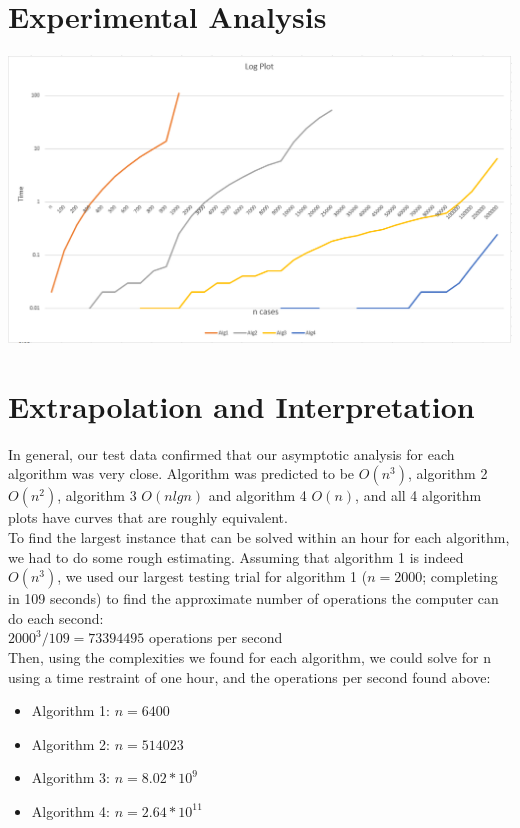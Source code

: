 \documentclass[11pt,letterpaper]{article}
\begin{document}
\section{Experimental Analysis}
\centerline{\includegraphics[width=7in]{LogPlot.png}}

\section{Extrapolation and Interpretation}
In general, our test data confirmed that our asymptotic analysis for each algorithm was very close. Algorithm was predicted to be $O(n^3)$, algorithm 2 $O(n^2)$, algorithm 3 $O(nlgn)$ and algorithm 4 $O(n)$, and all 4 algorithm plots have curves that are roughly equivalent.\vspace{8pt}
\\
To find the largest instance that can be solved within an hour for each algorithm, we had to do some rough estimating. Assuming that algorithm 1 is indeed $O(n^3)$, we used our largest testing trial for algorithm 1 ($n=2000$; completing in 109 seconds) to find the approximate number of operations the computer can do each second:\vspace{8pt}
\\
\hspace{10mm}$2000^3 / 109 = 73394495$ operations per second\vspace{8pt}
\\
Then, using the complexities we found for each algorithm, we could solve for n using a time restraint of one hour,  and the operations per second found above:\\
\begin{itemize}
\item Algorithm 1: $n=6400$
\item Algorithm 2: $n=514023$
\item Algorithm 3: $n=8.02*10^9$
\item Algorithm 4: $n=2.64*10^{11}$
\end{itemize}
\end{document}
